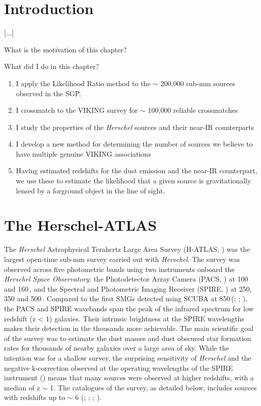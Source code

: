 \section{Introduction}

[...]

What is the motivation of this chapter?

What did I do in this chapter?
\begin{enumerate}
    \item I apply the Likelihood Ratio method to the $\sim$ 200,000 sub-mm sources observed in the SGP.
    \item I crossmatch to the VIKING survey for $\sim$ 100,000 reliable crossmatches
    \item I study the properties of the \textit{Herschel} sources and their near-IR counterparts
    \item I develop a new method for determining the number of sources we believe to have multiple genuine VIKING associations
    \item Having estimated redshifts for the dust emission and the near-IR counterpart, we use these to estimate the likelihood that a given source is gravitationally lensed by a forground object in the line of sight.
\end{enumerate}

\section{The Herschel-ATLAS}
\label{sec:The Herschel-ATLAS}

The \textit{Herschel} Astrophysical Terahertz Large Area Survey (H-ATLAS; \citealt{Eales_2010}) was the largest open-time sub-mm survey carried out with \textit{Herschel}. The survey was observed across five photometric bands using two instruments onboard the \textit{Herschel Space Observatory}: the Photodetector Array Camera (PACS, \citealt{Poglitsch_2010}) at 100 and 160\,\micron, and the Spectral and Photometric Imaging Receiver (SPIRE, \citealt{Griffin_2010}) at 250, 350 and 500\,\micron. Compared to the first SMGs detected using SCUBA at 850\,\micron (\citealt{Smail_1997}; \citealt{Barger_1998}; \citealt{Hughes_1998}), the PACS and SPIRE wavebands span the peak of the infrared spectrum for low redshift (z < 1) galaxies. Their intrinsic brightness at the SPIRE wavelengths makes their detection in the thousands more achievable. The main scientific goal of the survey was to estimate the dust masses and dust obscured star formation rates for thousands of nearby galaxies over a large area of sky. While the intention was for a shallow survey, the surprising sensitivity of \textit{Herschel} and the negative k-correction observed at the operating wavelengths of the SPIRE instrument (\citealt{Blain_1993}) means that many sources were observed at higher redshifts, with a median of z $\sim$ 1. The catalogues of the survey, as detailed below, includes sources with redshifts up to $\sim$ 6 (\citealt{Amblard_2010}; \citealt{Lapi_2011}; \citealt{Fudamoto_2017}; \citealt{Zavala_2018}).

